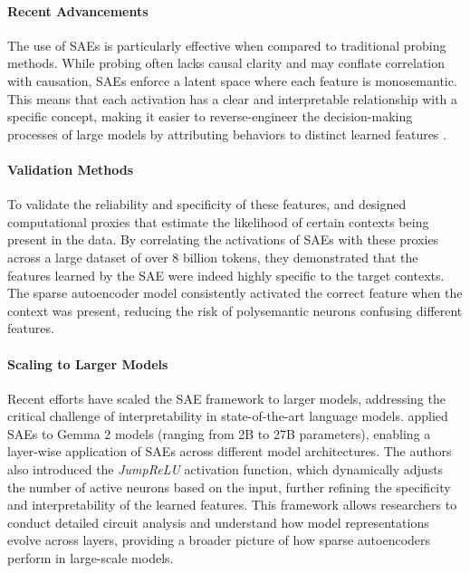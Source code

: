 \documentclass[sigconf,authoryear]{acmart}
\begin{document}
  \paragraph{Recent Advancements} The use of SAEs is particularly effective when compared to traditional probing methods. While probing often lacks causal clarity and may conflate correlation with causation, SAEs enforce a latent space where each feature is monosemantic. This means that each activation has a clear and interpretable relationship with a specific concept, making it easier to reverse-engineer the decision-making processes of large models by attributing behaviors to distinct learned features \citep{cunningham2023sparseautoencodershighlyinterpretable, bricken2023monosemanticity}.
  
  \paragraph{Validation Methods} To validate the reliability and specificity of these features, \citet{bricken2023monosemanticity} and \citet{cunningham2023sparseautoencodershighlyinterpretable} designed computational proxies that estimate the likelihood of certain contexts being present in the data. By correlating the activations of SAEs with these proxies across a large dataset of over 8 billion tokens, they demonstrated that the features learned by the SAE were indeed highly specific to the target contexts. The sparse autoencoder model consistently activated the correct feature when the context was present, reducing the risk of polysemantic neurons confusing different features.
  
  \paragraph{Scaling to Larger Models} Recent efforts have scaled the SAE framework to larger models, addressing the critical challenge of interpretability in state-of-the-art language models. \citet{lieberum2024gemmascopeopensparse} applied SAEs to Gemma 2 models (ranging from 2B to 27B parameters), enabling a layer-wise application of SAEs across different model architectures. The authors also introduced the \textit{JumpReLU} activation function, which dynamically adjusts the number of active neurons based on the input, further refining the specificity and interpretability of the learned features. This framework allows researchers to conduct detailed circuit analysis and understand how model representations evolve across layers, providing a broader picture of how sparse autoencoders perform in large-scale models.
  
\end{document}
